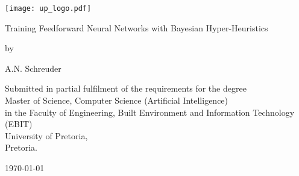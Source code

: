 \pagestyle{empty}
\begin{titlepage}
    \begin{center}
        \texttt{[image: up\_logo.pdf]}
        \vspace{2cm}

        \Huge
        \textsf{Training Feedforward Neural Networks with Bayesian
            Hyper-Heuristics}
        \vspace{1cm}

        \large
        \textsf{by}
        \vspace{1cm}

        \large
        \textsf{A.N. Schreuder}
        \vfill

        \normalsize
        \textsf{
            Submitted in partial fulfilment of the requirements for the degree\\
            Master of Science, Computer Science (Artificial Intelligence)\\
            in the Faculty of Engineering, Built Environment and Information
            Technology (EBIT)\\
            University of Pretoria,\\
            Pretoria.
        }
        \vspace{2cm}

        \normalsize
        \textsf{\monthyeardate\today}
    \end{center}
\end{titlepage}
\newpage


